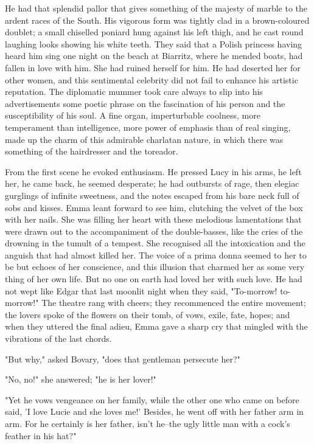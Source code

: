 \documentclass{tufte-book}
\begin{document}
He had that splendid pallor that gives something of the majesty of
marble to the ardent races of the South. His vigorous form was tightly
clad in a brown-coloured doublet; a small chiselled poniard hung against
his left thigh, and he cast round laughing looks showing his white
teeth. They said that a Polish princess having heard him sing one night
on the beach at Biarritz, where he mended boats, had fallen in love
with him. She had ruined herself for him. He had deserted her for
other women, and this sentimental celebrity did not fail to enhance his
artistic reputation. The diplomatic mummer took care always to slip into
his advertisements some poetic phrase on the fascination of his
person and the susceptibility of his soul. A fine organ, imperturbable
coolness, more temperament than intelligence, more power of emphasis
than of real singing, made up the charm of this admirable charlatan
nature, in which there was something of the hairdresser and the
toreador.

From the first scene he evoked enthusiasm. He pressed Lucy in his arms,
he left her, he came back, he seemed desperate; he had outbursts of
rage, then elegiac gurglings of infinite sweetness, and the notes
escaped from his bare neck full of sobs and kisses. Emma leant forward
to see him, clutching the velvet of the box with her nails. She was
filling her heart with these melodious lamentations that were drawn
out to the accompaniment of the double-basses, like the cries of the
drowning in the tumult of a tempest. She recognised all the intoxication
and the anguish that had almost killed her. The voice of a prima donna
seemed to her to be but echoes of her conscience, and this illusion that
charmed her as some very thing of her own life. But no one on earth had
loved her with such love. He had not wept like Edgar that last moonlit
night when they said, "To-morrow! to-morrow!" The theatre rang with
cheers; they recommenced the entire movement; the lovers spoke of
the flowers on their tomb, of vows, exile, fate, hopes; and when they
uttered the final adieu, Emma gave a sharp cry that mingled with the
vibrations of the last chords.

"But why," asked Bovary, "does that gentleman persecute her?"

"No, no!" she answered; "he is her lover!"

"Yet he vows vengeance on her family, while the other one who came on
before said, 'I love Lucie and she loves me!' Besides, he went off with
her father arm in arm. For he certainly is her father, isn't he--the
ugly little man with a cock's feather in his hat?"
\end{document}
